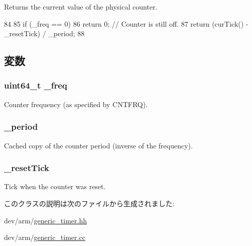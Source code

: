Returns the current value of the physical counter. 


\begin{DoxyCode}
84         {
85             if (_freq == 0)
86                 return 0;  // Counter is still off.
87             return (curTick() - _resetTick) / _period;
88         }
\end{DoxyCode}


\subsection{変数}
\hypertarget{classGenericTimer_1_1SystemCounter_acf4c3a958c13bdb7f0115780a27dd982}{
\subsubsection[{\_\-freq}]{\setlength{\rightskip}{0pt plus 5cm}uint64\_\-t {\bf \_\-freq}}}
\label{classGenericTimer_1_1SystemCounter_acf4c3a958c13bdb7f0115780a27dd982}


Counter frequency (as specified by CNTFRQ). \hypertarget{classGenericTimer_1_1SystemCounter_a8788f63b755d8a1d2a06a60f4738e970}{
\subsubsection[{\_\-period}]{ {\bf \_\-period}}}
\label{classGenericTimer_1_1SystemCounter_a8788f63b755d8a1d2a06a60f4738e970}


Cached copy of the counter period (inverse of the frequency). \hypertarget{classGenericTimer_1_1SystemCounter_acaf0706f2d4dfb34660df9ceb3780897}{
\subsubsection[{\_\-resetTick}]{ {\bf \_\-resetTick}}}
\label{classGenericTimer_1_1SystemCounter_acaf0706f2d4dfb34660df9ceb3780897}


Tick when the counter was reset. 

このクラスの説明は次のファイルから生成されました:\begin{DoxyCompactItemize}
\item 
dev/arm/\hyperlink{generic__timer_8hh}{generic\_\-timer.hh}\item 
dev/arm/\hyperlink{generic__timer_8cc}{generic\_\-timer.cc}\end{DoxyCompactItemize}

